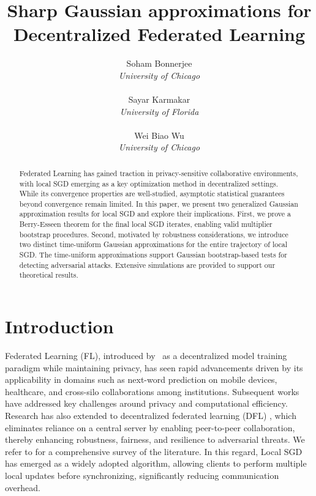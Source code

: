 \documentclass[a4paper,11pt]{article}
\title{Sharp Gaussian approximations for Decentralized Federated Learning}
\author{%
  Soham Bonnerjee\\ 
  \textit{University of Chicago}\\
  \\
  Sayar Karmakar \\
  \textit{University of Florida}\\
  \\
 Wei Biao Wu\\
 \textit{University of Chicago}\\
}
\numberwithin{equation}{section}
\theoremstyle{plain}
\theoremstyle{remark}
\begin{document}
\maketitle


\begin{abstract}
 Federated Learning has gained traction in privacy-sensitive collaborative environments, with local SGD emerging as a key optimization method in decentralized settings. While its convergence properties are well-studied, asymptotic statistical guarantees beyond convergence remain limited. In this paper, we present two generalized Gaussian approximation results for local SGD and explore their implications. First, we prove a Berry-Esseen theorem for the final local SGD iterates, enabling valid multiplier bootstrap procedures. Second, motivated by robustness considerations, we introduce two distinct time-uniform Gaussian approximations for the entire trajectory of local SGD. The time-uniform approximations support Gaussian bootstrap-based tests for detecting adversarial attacks. Extensive simulations are provided to support our theoretical results.
\end{abstract}

\section{Introduction}\label{se:intro}

Federated Learning (FL), introduced by~\cite{mcmahan2017communication} as a decentralized model training paradigm while maintaining privacy, has seen rapid advancements driven by its applicability in domains such as next-word prediction on mobile devices, healthcare, and cross-silo collaborations among institutions. Subsequent works~\cite{kairouz2021advances, li2020federated, karimireddy2020scaffold, wang2020tackling, alistarh2017qsgd, lin2018don} have addressed key challenges around privacy and computational efficiency. Research has also extended to decentralized federated learning (DFL) \cite{lalitha2019peer, lian2017can, he2019central, kim2020blockchained, lian2017can, wang2021}, which eliminates reliance on a central server by enabling peer-to-peer collaboration, thereby enhancing robustness, fairness, and resilience to adversarial threats. We refer to \cite{gabrielli2023survey, yuan2024decentralized} for a comprehensive survey of the literature. In this regard, Local SGD~\cite{stich2018local, khaled2020tighter, woodworth2020} has emerged as a widely adopted algorithm, allowing clients to perform multiple local updates before synchronizing, significantly reducing communication overhead.
\end{document}
